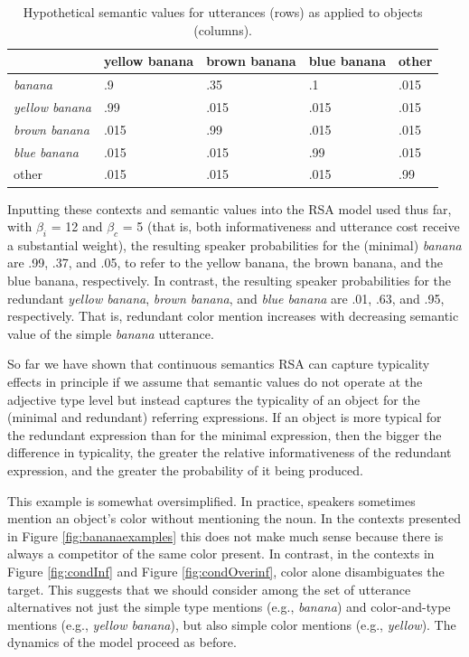 \documentclass[11pt]{article}
\newcommand{\figref}[1]{Figure \ref{#1}}
\begin{document}
\begin{table}
\centering
\caption{Hypothetical semantic values for utterances (rows) as applied to objects (columns).}
\begin{tabular}{l l l l l}
\toprule
 & yellow banana & brown banana & blue banana & other\\
\midrule
\emph{banana} & .9 & .35 & .1 & .015 \\
\midrule
\emph{yellow banana} & .99 & .015 & .015 & .015 \\
\emph{brown banana} & .015 & .99 & .015 & .015 \\
\emph{blue banana} & .015 & .015 & .99 & .015 \\
\midrule
other & .015 & .015 & .015 & .99 \\
\bottomrule
\end{tabular}
\label{tab:colorobjectfidelities}
\end{table}

Inputting these contexts and semantic values into the RSA model used thus far, with $\beta_i$ = 12 and $\beta_c$ = 5 (that is, both informativeness and utterance cost receive a substantial weight), the resulting speaker probabilities for the (minimal) \emph{banana} are .99, .37, and .05, to refer to the yellow banana, the brown banana, and the blue banana, respectively. In contrast, the resulting speaker probabilities for the redundant \emph{yellow banana}, \emph{brown banana}, and \emph{blue banana} are .01, .63, and .95, respectively. That is, redundant color mention increases with decreasing semantic value of the simple \emph{banana} utterance.

So far we have shown that continuous semantics RSA can capture typicality effects in principle if we assume that semantic values do not operate at the adjective type level but instead captures the typicality of an object for the (minimal and redundant) referring expressions. If an object is more typical for the redundant expression than for the minimal expression, then the bigger the difference in typicality, the greater the relative informativeness of the redundant expression, and the greater the probability of it being produced. 

This example is somewhat oversimplified. In practice, speakers sometimes mention an object's color without mentioning the noun. In the contexts presented in \figref{fig:bananaexamples} this does not make much sense because there is always a competitor of the same color present. In contrast, in the contexts in \figref{fig:condInf} and \figref{fig:condOverinf}, color alone disambiguates the target. This suggests that we should consider among the set of utterance alternatives not just the simple type mentions (e.g., \emph{banana}) and color-and-type mentions (e.g., \emph{yellow banana}), but also simple color mentions (e.g., \emph{yellow}). The dynamics of the model proceed as before.
\end{document}
